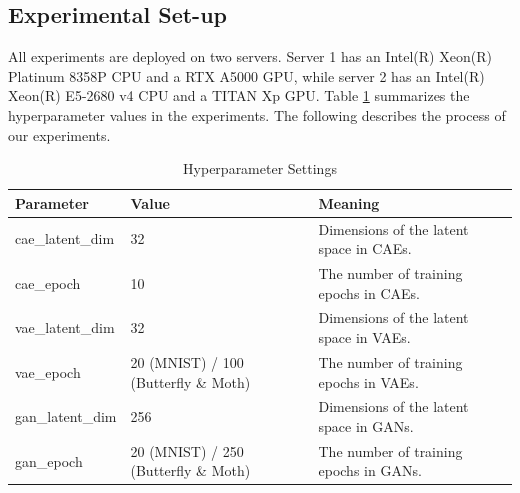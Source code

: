 \documentclass{article}
\begin{document}
\subsection{Experimental Set-up}
All experiments are deployed on two servers. Server 1 has an Intel(R) Xeon(R) Platinum 8358P CPU and a RTX A5000 GPU, while server 2 has an Intel(R) Xeon(R) E5-2680 v4 CPU and a TITAN Xp GPU. Table \ref{tab:3-hyper} summarizes the hyperparameter values in the experiments. The following describes the process of our experiments.
\begin{table}[!ht]
    \centering
    \caption{Hyperparameter Settings}
    \label{tab:3-hyper}
    \begin{tabular}{lll}
        \toprule
        \textbf{Parameter} & \textbf{Value} & \textbf{Meaning}\\
        \midrule
        cae\_latent\_dim & 32 & Dimensions of the latent space in CAEs.\\
        cae\_epoch & 10 & The number of training epochs in CAEs.\\
        vae\_latent\_dim & 32 & Dimensions of the latent space in VAEs.\\
        vae\_epoch & 20 (MNIST) / 100 (Butterfly \& Moth) & The number of training epochs in VAEs.\\
        gan\_latent\_dim & 256 & Dimensions of the latent space in GANs.\\
        gan\_epoch & 20 (MNIST) / 250 (Butterfly \& Moth) & The number of training epochs in GANs.\\
        \bottomrule
    \end{tabular}
\end{table}
\end{document}
